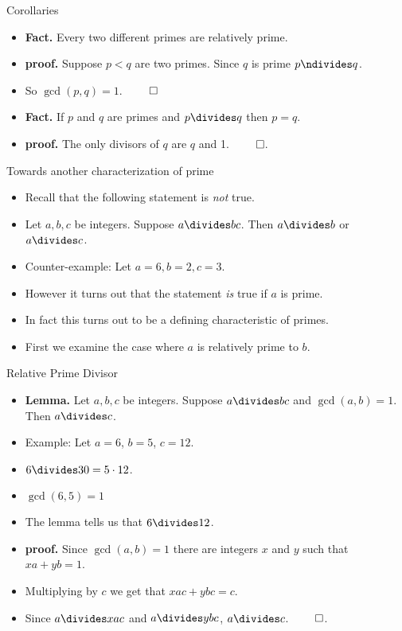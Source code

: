 \documentclass[handout]{beamer}
\begin{document}

\begin{frame}{Corollaries}

\begin{itemize}
  \item \textbf{Fact.} Every two different primes are relatively prime.
  \item \textbf{proof.} Suppose $p<q$ are two primes. Since $q$ is prime $p\ndivides q$.
  \item So $\gcd(p,q)=1$. $\qed$
  \item \textbf{Fact.} If $p$ and $q$ are primes and $p\divides q$ then $p=q$.
  \item \textbf{proof.} The only divisors of $q$ are $q$ and 1. $\qed$.
\end{itemize}
\end{frame}



\begin{frame}{Towards another characterization of prime}
\begin{itemize}
  \item Recall that the following statement is \emph{not} true.
  \item Let $a,b,c$ be integers. Suppose $a\divides bc$. Then $a\divides b$ or $a\divides c$.
  \item Counter-example: Let $a=6, b=2, c=3$.
  \item However it turns out that the statement \emph{is} true if $a$ is prime.
  \item In fact this turns out to be a defining characteristic of primes.
  \item First we examine the case where $a$ is relatively prime to $b$.
\end{itemize}

\end{frame}


\begin{frame}{Relative Prime Divisor}

\begin{itemize}
  \item \textbf{Lemma.} Let $a,b,c$ be integers. Suppose $a\divides bc$ and $\gcd(a,b)=1$. Then $a\divides c$.
  \item Example: Let $a=6$, $b=5$, $c=12$.
  \item $6\divides 30 = 5\cdot 12$.
  \item $\gcd(6,5) = 1$
  \item The lemma tells us that $6\divides 12$.
  \item \textbf{proof.} Since $\gcd(a,b)=1$ there are integers $x$ and $y$ such that $xa + yb = 1$.
  \item Multiplying by $c$ we get that $xac + ybc = c$.
  \item Since $a\divides xac$ and $a\divides ybc$, $a\divides c$. $\qed$.
\end{itemize}

\end{frame}
\end{document}
